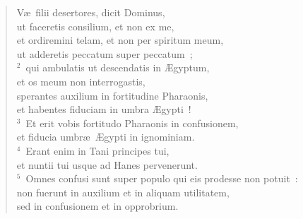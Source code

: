 \begin{flushleft}\begin{verse}\vspace{-19pt}\hspace{6pt}V\ae\ filii desertores, dicit Dominus,\\\hspace{6pt} ut faceretis consilium, et non ex me,\\ et ordiremini telam, et non per spiritum meum,\\ ut adderetis peccatum super peccatum~;\\
${}^{2}$~qui ambulatis ut descendatis in \AE gyptum,\\ et os meum non interrogastis,\\ sperantes auxilium in fortitudine Pharaonis,\\ et habentes fiduciam in umbra \AE gypti~!\\
${}^{3}$~Et erit vobis fortitudo Pharaonis in confusionem,\\ et fiducia umbr\ae\ \AE gypti in ignominiam.\\
${}^{4}$~Erant enim in Tani principes tui,\\ et nuntii tui usque ad Hanes pervenerunt.\\
${}^{5}$~Omnes confusi sunt super populo qui eis prodesse non potuit~:\\ non fuerunt in auxilium et in aliquam utilitatem,\\ sed in confusionem et in opprobrium.\end{verse}\end{flushleft}


